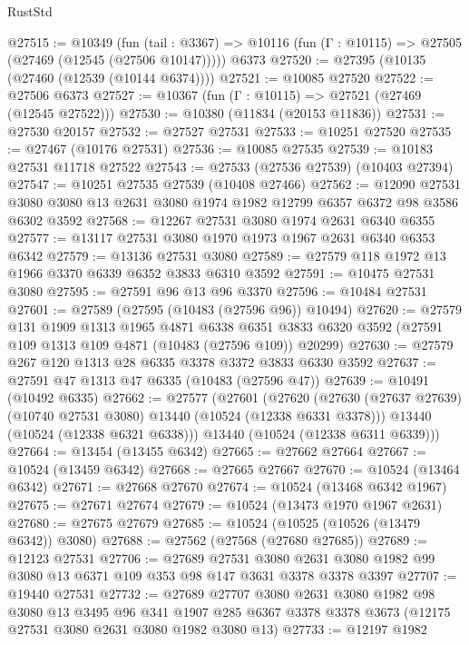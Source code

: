 \begin{lexlean}{RustStd}
\begin{coremodule}
@27515 := @10349
    (fun (tail : @3367) => @10116 (fun (Γ : @10115) => @27505 (@27469 (@12545 (@27506 @10147)))))
    @6373
@27520 := @27395 (@10135 (@27460 (@12539 (@10144 @6374))))
@27521 := @10085 @27520
@27522 := @27506 @6373
@27527 := @10367 (fun (Γ : @10115) => @27521 (@27469 (@12545 @27522)))
@27530 := @10380 (@11834 (@20153 @11836))
@27531 := @27530 @20157
@27532 := @27527 @27531
@27533 := @10251 @27520
@27535 := @27467 (@10176 @27531)
@27536 := @10085 @27535
@27539 := @10183 @27531 @11718 @27522
@27543 := @27533 (@27536 @27539) (@10403 @27394)
@27547 := @10251 @27535 @27539 (@10408 @27466)
@27562 := @12090
    @27531
    @3080
    @3080
    @13
    @2631
    @3080
    @1974
    @1982
    @12799
    @6357
    @6372
    @98
    @3586
    @6302
    @3592
@27568 := @12267 @27531 @3080 @1974 @2631 @6340 @6355
@27577 := @13117 @27531 @3080 @1970 @1973 @1967 @2631 @6340 @6353 @6342
@27579 := @13136 @27531 @3080
@27589 := @27579 @118 @1972 @13 @1966 @3370 @6339 @6352 @3833 @6310 @3592
@27591 := @10475 @27531 @3080
@27595 := @27591 @96 @13 @96 @3370
@27596 := @10484 @27531
@27601 := @27589 (@27595 (@10483 (@27596 @96)) @10494)
@27620 := @27579
    @131
    @1909
    @1313
    @1965
    @4871
    @6338
    @6351
    @3833
    @6320
    @3592
    (@27591 @109 @1313 @109 @4871 (@10483 (@27596 @109)) @20299)
@27630 := @27579 @267 @120 @1313 @28 @6335 @3378 @3372 @3833 @6330 @3592
@27637 := @27591 @47 @1313 @47 @6335 (@10483 (@27596 @47))
@27639 := @10491 (@10492 @6335)
@27662 := @27577
    (@27601
      (@27620
        (@27630 (@27637 @27639) (@10740 @27531 @3080) @13440 (@10524 (@12338 @6331 @3378)))
        @13440
        (@10524 (@12338 @6321 @6338)))
      @13440
      (@10524 (@12338 @6311 @6339)))
@27664 := @13454 (@13455 @6342)
@27665 := @27662 @27664
@27667 := @10524 (@13459 @6342)
@27668 := @27665 @27667
@27670 := @10524 (@13464 @6342)
@27671 := @27668 @27670
@27674 := @10524 (@13468 @6342 @1967)
@27675 := @27671 @27674
@27679 := @10524 (@13473 @1970 @1967 @2631)
@27680 := @27675 @27679
@27685 := @10524 (@10525 (@10526 (@13479 @6342)) @3080)
@27688 := @27562 (@27568 (@27680 @27685))
@27689 := @12123 @27531
@27706 := @27689
    @27531
    @3080
    @2631
    @3080
    @1982
    @99
    @3080
    @13
    @6371
    @109
    @353
    @98
    @147
    @3631
    @3378
    @3378
    @3397
@27707 := @19440 @27531
@27732 := @27689
    @27707
    @3080
    @2631
    @3080
    @1982
    @98
    @3080
    @13
    @3495
    @96
    @341
    @1907
    @285
    @6367
    @3378
    @3378
    @3673
    (@12175 @27531 @3080 @2631 @3080 @1982 @3080 @13)
@27733 := @12197 @1982

\end{coremodule}
\end{lexlean}
